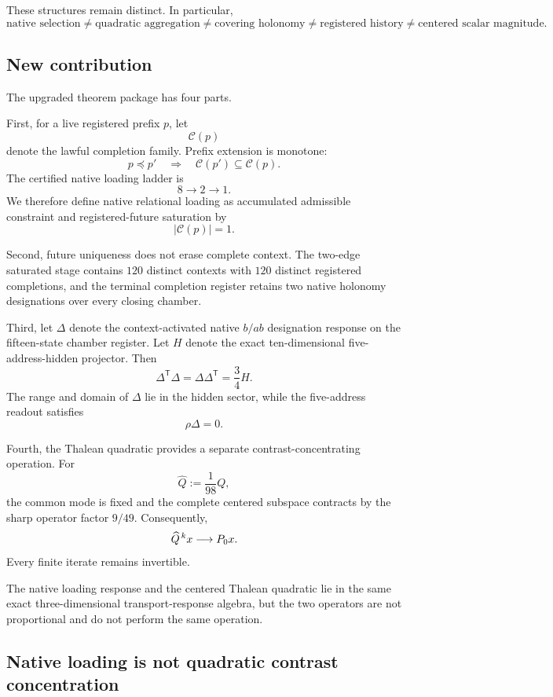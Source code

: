 These structures remain distinct.  In particular,
\[
\text{native selection}
\neq
\text{quadratic aggregation}
\neq
\text{covering holonomy}
\neq
\text{registered history}
\neq
\text{centered scalar magnitude}.
\]

\subsection{New contribution}

The upgraded theorem package has four parts.

First, for a live registered prefix \(p\), let
\[
\mathcal C(p)
\]
denote the lawful completion family.  Prefix extension is monotone:
\[
p\preceq p'
\quad\Longrightarrow\quad
\mathcal C(p')\subseteq\mathcal C(p).
\]
The certified native loading ladder is
\[
8\longrightarrow2\longrightarrow1.
\]
We therefore define native relational loading as accumulated
admissible constraint and registered-future saturation by
\[
|\mathcal C(p)|=1.
\]

Second, future uniqueness does not erase complete context.  The
two-edge saturated stage contains \(120\) distinct contexts with
\(120\) distinct registered completions, and the terminal completion
register retains two native holonomy designations over every closing
chamber.

Third, let \(\Delta\) denote the context-activated native
\(b/ab\) designation response on the fifteen-state chamber register.
Let \(H\) denote the exact ten-dimensional five-address-hidden
projector.  Then
\[
\Delta^{\mathsf T}\Delta
=
\Delta\Delta^{\mathsf T}
=
\frac34H.
\]
The range and domain of \(\Delta\) lie in the hidden sector, while
the five-address readout satisfies
\[
\rho\Delta=0.
\]

Fourth, the Thalean quadratic provides a separate
contrast-concentrating operation.  For
\[
\widehat Q:=\frac1{98}Q,
\]
the common mode is fixed and the complete centered subspace contracts
by the sharp operator factor \(9/49\).  Consequently,
\[
\widehat Q^{\,k}x
\longrightarrow
P_{0} x.
\]
Every finite iterate remains invertible.

The native loading response and the centered Thalean quadratic lie in
the same exact three-dimensional transport-response algebra, but the
two operators are not proportional and do not perform the same
operation.

\subsection{Native loading is not quadratic contrast concentration}

